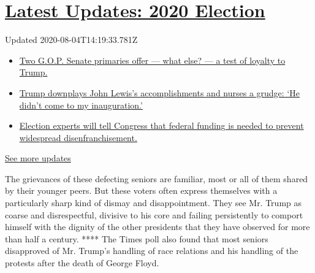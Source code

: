\hypertarget{latest-updates-2020-election}{%
\section{\texorpdfstring{\href{https://www.nytimes.com/2020/08/04/us/elections/primary-election-michigan-arizona-kansas.html?action=click\&pgtype=Article\&state=default\&region=MAIN_CONTENT_1\&context=storylines_live_updates}{Latest
Updates: 2020
Election}}{Latest Updates: 2020 Election}}\label{latest-updates-2020-election}}

Updated 2020-08-04T14:19:33.781Z

\begin{itemize}
\tightlist
\item
  \href{https://www.nytimes.com/2020/08/04/us/elections/primary-election-michigan-arizona-kansas.html?action=click\&pgtype=Article\&state=default\&region=MAIN_CONTENT_1\&context=storylines_live_updates\#link-3924dd44}{Two
  G.O.P. Senate primaries offer --- what else? --- a test of loyalty to
  Trump.}
\item
  \href{https://www.nytimes.com/2020/08/04/us/elections/primary-election-michigan-arizona-kansas.html?action=click\&pgtype=Article\&state=default\&region=MAIN_CONTENT_1\&context=storylines_live_updates\#link-24333e8c}{Trump
  downplays John Lewis's accomplishments and nurses a grudge: `He didn't
  come to my inauguration.'}
\item
  \href{https://www.nytimes.com/2020/08/04/us/elections/primary-election-michigan-arizona-kansas.html?action=click\&pgtype=Article\&state=default\&region=MAIN_CONTENT_1\&context=storylines_live_updates\#link-3c437e05}{Election
  experts will tell Congress that federal funding is needed to prevent
  widespread disenfranchisement.}
\end{itemize}

\href{https://www.nytimes.com/2020/08/04/us/elections/primary-election-michigan-arizona-kansas.html?action=click\&pgtype=Article\&state=default\&region=MAIN_CONTENT_1\&context=storylines_live_updates}{See
more updates}

The grievances of these defecting seniors are familiar, most or all of
them shared by their younger peers. But these voters often express
themselves with a particularly sharp kind of dismay and disappointment.
They see Mr. Trump as coarse and disrespectful, divisive to his core and
failing persistently to comport himself with the dignity of the other
presidents that they have observed for more than half a century. ****
The Times poll also found that most seniors disapproved of Mr. Trump's
handling of race relations and his handling of the protests after the
death of George Floyd.


